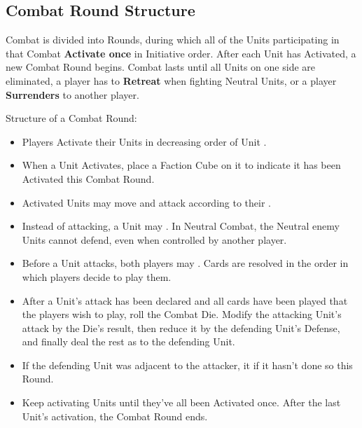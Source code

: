 \begin{multicols}{2}

\subsection*{Combat Round Structure}
Combat is divided into Rounds, during which all of the Units participating in that Combat \textbf{Activate once} in Initiative order.
After each Unit has Activated, a new Combat Round begins.
Combat lasts until all Units on one side are eliminated, a player has to \textbf{Retreat} when fighting Neutral Units, or a player \textbf{Surrenders} to another player.

Structure of a Combat Round:
\begin{itemize}
  \item Players Activate their Units in decreasing order of Unit .
  \item When a Unit Activates, place a Faction Cube on it to indicate it has been Activated this Combat Round.
  \item Activated Units may move and attack according to their .
  \item Instead of attacking, a Unit may .
  In Neutral Combat, the Neutral enemy Units cannot defend, even when controlled by another player.
  \item Before a Unit attacks, both players may . Cards are resolved in the order in which players decide to play them.
  \item After a Unit's attack has been declared and all cards have been played that the players wish to play, roll the Combat Die.
    Modify the attacking Unit's attack by the Die's result, then reduce it by the defending Unit's Defense, and finally deal the rest as  to the defending Unit.
  \item If the defending Unit was adjacent to the attacker, it  if it hasn't done so this Round.
  \item Keep activating Units until they've all been Activated once.
After the last Unit's activation, the Combat Round ends.
\end{itemize}
\vspace*{\fill}
\columnbreak

\end{multicols}
